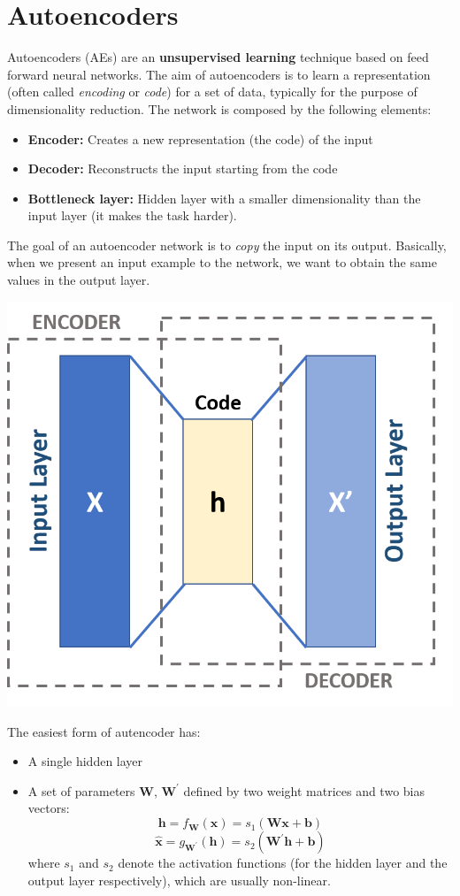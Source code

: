 \section{Autoencoders}
Autoencoders (AEs) are an \textbf{unsupervised learning} technique based on feed forward neural networks. The aim of autoencoders is to learn a representation (often called \textit{encoding} or \textit{code}) for a set of data, typically for the purpose of dimensionality reduction. The network is composed by the following elements:
\begin{itemize}
    \item \textbf{Encoder:} Creates a new representation (the code) of the input
    \item \textbf{Decoder:} Reconstructs the input starting from the code
    \item \textbf{Bottleneck layer:} Hidden layer with a smaller dimensionality than the input layer (it makes the task harder). 
\end{itemize}
The goal of an autoencoder network is to \textit{copy} the input on its output. Basically, when we present an input example to the network, we want to obtain the same values in the output layer.
\begin{center}
    \includegraphics[scale = 0.4]{images/Autoencoder.png}
\end{center}
The easiest form of autencoder has:
\begin{itemize}
    \item A single hidden layer
    \item A set of parameters $\textbf{W}$, $\textbf{W}^{'}$ defined by two weight matrices and two bias vectors:
    \[\textbf{h} = f_{\textbf{W}}(\textbf{x}) = s_{1}(\textbf{Wx} + \textbf{b})\]
    \[\hat{\textbf{x}}= g_{\textbf{W}^{'}}(\textbf{h}) = s_{2}(\textbf{W}^{'}\textbf{h} + \textbf{b})\]
    where $s_{1}$ and $s_{2}$ denote the activation functions (for the hidden layer and the output layer respectively), which are usually non-linear.
\end{itemize}
